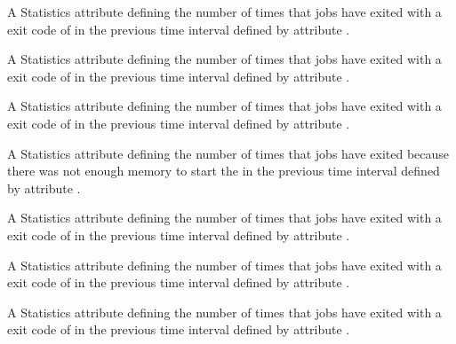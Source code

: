 \begin{description}
\item[\AdAttr{RecentJobsKilled}:] A Statistics attribute defining
  the number of times that jobs 
  have exited with a  exit code of 
  in the previous time interval defined by attribute .

\item[\AdAttr{RecentJobsMissedDeferralTime}:] A Statistics attribute defining
  the number of times that jobs 
  have exited with a  exit code of 
  in the previous time interval defined by attribute .

\item[\AdAttr{RecentJobsNotStarted}:] A Statistics attribute defining
  the number of times that jobs 
  have exited with a  exit code of 
  in the previous time interval defined by attribute .

\item[\AdAttr{RecentJobsShadowNoMemory}:] A Statistics attribute defining
  the number of times that jobs have exited 
  because there was not enough memory to start the 
  in the previous time interval defined by attribute .

\item[\AdAttr{RecentJobsShouldHold}:] A Statistics attribute defining
  the number of times that jobs
  have exited with a  exit code of 
  in the previous time interval defined by attribute .

\item[\AdAttr{RecentJobsShouldRemove}:] A Statistics attribute defining
  the number of times that jobs 
  have exited with a  exit code of 
  in the previous time interval defined by attribute .

\item[\AdAttr{RecentJobsShouldRequeue}:] A Statistics attribute defining
  the number of times that jobs 
  have exited with a  exit code of 
  in the previous time interval defined by attribute .


\end{description}
